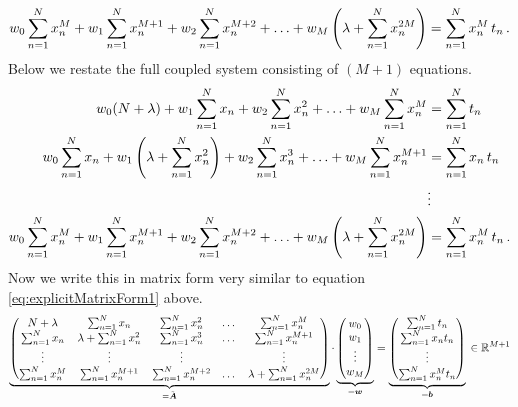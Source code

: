 \documentclass[11pt,DINA4, fleqn]{amsart}
\def\vw{\boldsymbol{w}\xspace}
\def\vb{\boldsymbol{b}\xspace}
\def\mA{\boldsymbol{A}\xspace}
\begin{document}
\begin{align}
w_0 \sum \displaylimits_{n = 1}^{N} x_n^M 
+ w_1 \sum \displaylimits_{n = 1}^{N} x_n^{M + 1} 
+ w_2 \sum \displaylimits_{n = 1}^{N} x_n^{M + 2} 
+ \dotsc 
+ w_M \left( \lambda + \sum \displaylimits_{n = 1}^{N} x_n^{2M} \right)
 = \sum \displaylimits_{n = 1}^{N} x_n^M \, t_n \, .
\end{align}
Below we restate the full coupled system consisting of $(M+1)$ equations.
\begin{align}
w_0 (N + \lambda) + w_1 \sum \displaylimits_{n = 1}^{N} x_n 
+ w_2 \sum \displaylimits_{n = 1}^{N} x_n^2 + \dotsc 
+ w_M \sum \displaylimits_{n = 1}^{N} x_n^M &= \sum \displaylimits_{n = 1}^{N} t_n \\
w_0 \sum \displaylimits_{n = 1}^{N} x_n 
+ w_1 \left( \lambda + \sum \displaylimits_{n = 1}^{N} x_n^2 \right) 
+ w_2 \sum \displaylimits_{n = 1}^{N} x_n^3 + \dotsc 
+ w_M \sum \displaylimits_{n = 1}^{N} x_n^{M + 1} &= \sum \displaylimits_{n = 1}^{N} x_n \, t_n \\
&\vdots \\
w_0 \sum \displaylimits_{n = 1}^{N} x_n^M 
+ w_1 \sum \displaylimits_{n = 1}^{N} x_n^{M + 1} 
+ w_2 \sum \displaylimits_{n = 1}^{N} x_n^{M + 2} 
+ \dotsc 
+ w_M \left( \lambda + \sum \displaylimits_{n = 1}^{N} x_n^{2M} \right)
&= \sum \displaylimits_{n = 1}^{N} x_n^M \, t_n \, .
\end{align}
Now we write this in matrix form very similar to equation \eqref{eq:explicitMatrixForm1} above.
\begin{align}
\underbrace{
	\begin{pmatrix}
	N + \lambda& \sum\displaylimits_{n = 1}^{N}x_n & \sum\displaylimits_{n = 1}^{N}x_n^2 & \dots & \sum\displaylimits_{n = 1}^{N}x_n^M \\
	\sum\displaylimits_{n = 1}^{N}x_n & \lambda + \sum\displaylimits_{n = 1}^{N}x_n^2 &
	\sum\displaylimits_{n = 1}^{N}x_n^3 & \dots &
	\sum\displaylimits_{n = 1}^{N}x_n^{M + 1} \\
	\vdots & \vdots & \vdots && \vdots \\ 
	\sum\displaylimits_{n = 1}^{N}x_n^M &
	\sum\displaylimits_{n = 1}^{N}x_n^{M+1} &
	\sum\displaylimits_{n = 1}^{N}x_n^{M+2} &
	\dotsc &  \lambda + \sum\displaylimits_{n = 1}^{N}x_n^{2M}
	\end{pmatrix}}_{=\tilde{\mA}} \cdot
\underbrace{\begin{pmatrix}
	w_0 \\ w_1 \\ \vdots \\ w_M
	\end{pmatrix}}_{=\vw}
=
\underbrace{\begin{pmatrix}
	\sum\displaylimits_{n = 1}^{N} t_n \\
	\sum\displaylimits_{n = 1}^{N} x_n t_n \\
	\vdots \\
	\sum\displaylimits_{n = 1}^{N} x_n^M t_n 
	\end{pmatrix}}_{=\vb} \, \in \mathbb{R}^{M+1}
\label{eq:explicitMatrixForm1}
\end{align}
\end{document}
